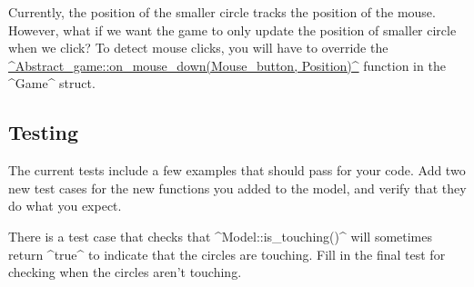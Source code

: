 \documentclass{tufte-handout}
\begin{document}
Currently, the position of the smaller circle tracks the position of the
mouse. However, what if we want the game to only update the position of
smaller circle when we click? To detect mouse clicks, you will have to
override the
\href{https://bit.ly/39jNovM}
{^Abstract_game::on_mouse_down(Mouse_button, Position)^}
function in the ^Game^ struct.

\subsection{Testing}

The current tests include a few examples that should pass
for your code. Add two new test cases for the new functions you added to
the model, and verify that they do what you expect.

There is a test case that checks that ^Model::is_touching()^ will
sometimes return ^true^ to indicate that the circles are touching.
Fill in the final test for checking when the circles aren't touching.
\end{document}
